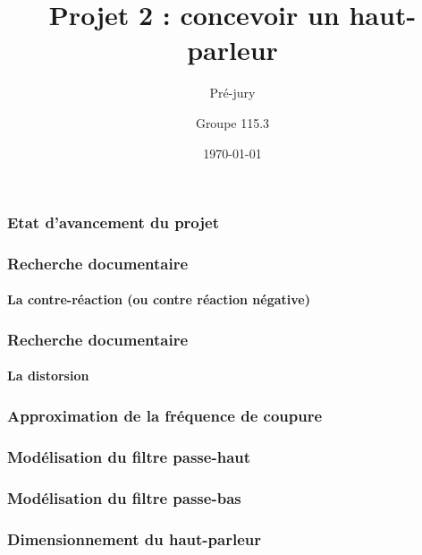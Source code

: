 \documentclass[pdf]{beamer}
\title{Projet 2 : concevoir un haut-parleur}
\subtitle{Pré-jury}
\author{Groupe 115.3}
\date{\today}
\begin{document}
\begin{frame}
	\titlepage
\end{frame}

\begin{frame}
	\frametitle{Etat d'avancement du projet}	
\end{frame}

\begin{frame}
	\frametitle{Recherche documentaire}
	\framesubtitle{La contre-réaction (ou contre réaction négative)}
	
	
	
\end{frame}

\begin{frame}
	\frametitle{Recherche documentaire}
	\framesubtitle{La distorsion}
\end{frame}
	
\begin{frame}
	\frametitle{Approximation de la fréquence de coupure}
\end{frame}

\begin{frame}
	\frametitle{Modélisation du filtre passe-haut}
\end{frame}

\begin{frame}
	\frametitle{Modélisation du filtre passe-bas}
\end{frame}

\begin{frame}
	\frametitle{Dimensionnement du haut-parleur}
\end{frame}
\end{document}

